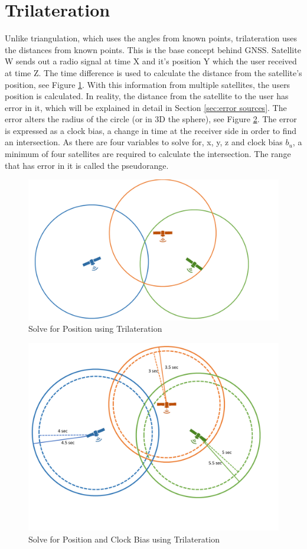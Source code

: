 
\section{Trilateration}
Unlike triangulation, which uses the angles from known points, trilateration uses the distances from known points. This is the base concept behind GNSS. Satellite W sends out a radio signal at time X and it's position Y which the user received at time Z. The time difference is used to calculate the distance from the satellite's position, see Figure \ref{fig:trilateration}. With this information from multiple satellites, the users position is calculated. In reality, the distance from the satellite to the user has error in it, which will be explained in detail in Section \ref{sec:error sources}. The error alters the radius of the circle (or in 3D the sphere), see Figure \ref{fig:trilaterationtime}. The error is expressed as a clock bias, a change in time at the receiver side in order to find an intersection. As there are four variables to solve for, x, y, z and clock bias $b_u$, a minimum of four satellites are required to calculate the intersection. The range that has error in it is called the pseudorange.
\begin{figure}
\centering
\caption{Solve for Position using Trilateration}
\label{fig:trilateration}
\includegraphics[width=0.7\linewidth]{ChapterLiteratureReview/trilateration}
\end{figure}
\begin{figure}
\centering
\caption{Solve for Position and Clock Bias using Trilateration}
\label{fig:trilaterationtime}
\includegraphics[width=0.7\linewidth]{ChapterLiteratureReview/trilaterationtime}
\end{figure}

